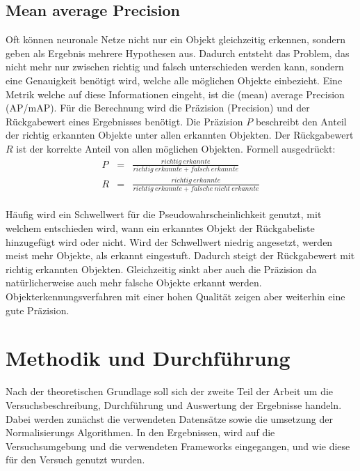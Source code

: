 \documentclass[a4paper,12pt,oneside]{article}
\begin{document}
  \subsection{Mean average Precision}\label{s.map}
Oft können neuronale Netze nicht nur ein Objekt gleichzeitig erkennen, sondern geben als Ergebnis mehrere Hypothesen aus. Dadurch entsteht das Problem, das nicht mehr nur zwischen richtig und falsch unterschieden werden kann, sondern eine Genauigkeit benötigt wird, welche alle möglichen Objekte einbezieht. Eine Metrik welche auf diese Informationen eingeht, ist die (mean) average Precision (AP/mAP). Für die Berechnung wird die Präzision (Precision) und der Rückgabewert eines Ergebnisses benötigt. Die Präzision $P$ beschreibt den Anteil der richtig erkannten Objekte unter allen erkannten Objekten. Der Rückgabewert $R$ ist der korrekte Anteil von allen möglichen Objekten. Formell ausgedrückt:\\
\begin{eqnarray}
P&=&\frac{richtig\medspace erkannte}{richtig\medspace erkannte + falsch\medspace erkannte}\\
R&=&\frac{richtig\medspace erkannte}{richtig\medspace erkannte + falsche\medspace nicht\medspace erkannte}
\end{eqnarray}\\
Häufig wird ein Schwellwert für die Pseudowahrscheinlichkeit genutzt, mit welchem entschieden wird, wann ein erkanntes Objekt der Rückgabeliste hinzugefügt wird oder nicht. Wird der Schwellwert niedrig angesetzt, werden meist mehr Objekte, als erkannt eingestuft. Dadurch steigt der Rückgabewert mit richtig erkannten Objekten. Gleichzeitig sinkt aber auch die Präzision da natürlicherweise auch mehr falsche Objekte erkannt werden. Objekterkennungsverfahren mit einer hohen Qualität zeigen aber weiterhin eine gute Präzision.

\newpage
  \section{Methodik und Durchführung}\label{s.methudurchf}
Nach der theoretischen Grundlage soll sich der zweite Teil der Arbeit um die Versuchsbeschreibung, Durchführung und Auswertung der Ergebnisse handeln. Dabei werden zunächst die verwendeten Datensätze sowie die umsetzung der Normalisierungs Algorithmen. In den Ergebnissen, wird auf die Versuchsumgebung und die verwendeten Frameworks eingegangen, und wie diese für den Versuch genutzt wurden.
\end{document}
